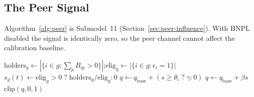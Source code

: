 \subsection{The Peer Signal}\label{app:main-peer}

Algorithm~\ref{alg:peer} is Submodel~11 (Section~\ref{sec:peer-influence}). With \ac{BNPL}
disabled the signal is identically zero, so the peer channel cannot affect the calibration
baseline.

\begin{algorithm}[!htbp]
\caption{Peer-signal update and propensity}
\label{alg:peer}
\begin{algorithmic}
    \State $\text{holders}_g \gets |\{i \in g : \sum_p B_{ip} > 0\}|$;\quad $\text{elig}_g \gets |\{i \in g : \epsilon_i = 1\}|$
    \State $s_g(t) \gets \text{elig}_g > 0 \;?\; \text{holders}_g / \text{elig}_g : 0$ 
\EndFor
\Statex
{} 
        \State $q \gets q_{\text{base}} + (s \geq \theta_i \;?\; \gamma : 0)$
    \Else
        \State $q \gets q_{\text{base}} + \beta s$ 
    \EndIf
    \State \Return $\mathrm{clip}(q, 0, 1)$
\EndFunction
\end{algorithmic}
\end{algorithm}
